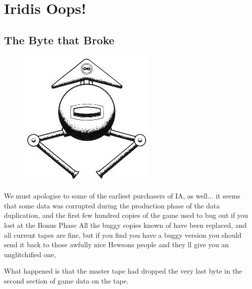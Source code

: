\chapter{Iridis Oops!} 
\label{sec:bugs}
\lstset{style=6502Style}

\section{The Byte that Broke}
\begin{definition}
\setlength{\intextsep}{0pt}%
\setlength{\columnsep}{3pt}%
\begin{figure}
\includegraphics[width=\linewidth]{src/callout/ia.jpg} 
\end{figure}
\small
We must apologise to some of the earliest purchasers of IA, as well... it
seems that some data was corrupted during the production phase of the
data duplication, and the first few hundred copies of the game used to bug
out if you lost at the Bonus Phase All the buggy copies known of have
been replaced, and all current tapes are fine, but if you find you have a
buggy version you should send it back to those awfully nice Hewsons
people and they ll give you an unglitchified one,
\end{definition}

What happened is that the master tape had dropped the very last byte in the second
section of game data on the tape.

